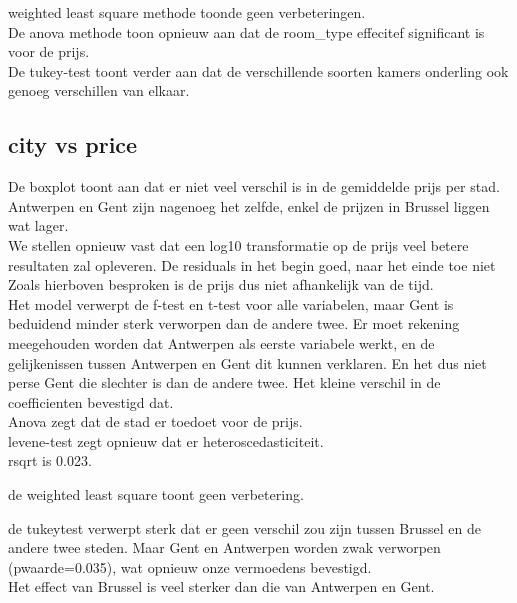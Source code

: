 \documentclass[a4paper,kulak]{kulakarticle} %
\begin{document}
weighted least square methode toonde geen verbeteringen. \\

De anova methode toon opnieuw aan dat de room\_type effecitef significant is voor de prijs.\\

De tukey-test toont verder aan dat de verschillende soorten kamers onderling ook genoeg verschillen van elkaar. \\


\subsection{city vs price}
De boxplot toont aan dat er niet veel verschil is in de gemiddelde prijs per stad. Antwerpen en Gent zijn nagenoeg het zelfde, enkel de prijzen in Brussel liggen wat lager. \\

We stellen opnieuw vast dat een log10 transformatie op de prijs veel betere resultaten zal opleveren. De residuals in het begin goed, naar het einde toe niet\\

Zoals hierboven besproken is de prijs dus niet afhankelijk van de tijd. \\

Het model verwerpt de f-test en t-test voor alle variabelen, maar Gent is beduidend minder sterk verworpen dan de andere twee. Er moet rekening meegehouden worden dat Antwerpen als eerste variabele werkt, en de gelijkenissen tussen Antwerpen en Gent dit kunnen verklaren. En het dus niet perse Gent die slechter is dan de andere twee. Het kleine verschil in de coefficienten bevestigd dat.\\

Anova zegt dat de stad er toedoet voor de prijs. \\

levene-test zegt opnieuw dat er heteroscedasticiteit.\\

rsqrt is 0.023.

de weighted least square toont geen verbetering.

de tukeytest verwerpt sterk dat er geen verschil zou zijn tussen Brussel en de andere twee steden. Maar Gent en Antwerpen worden zwak verworpen (pwaarde=0.035), wat opnieuw onze vermoedens bevestigd. \\

Het effect van Brussel is veel sterker dan die van Antwerpen en Gent. \\
\end{document}

